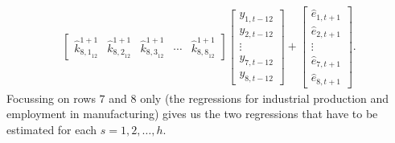 \documentclass[a4paper,11pt,listof=nochaptergap,oneside,pointednumbers,bibtotoc,bigheadings,liststotoc]{scrbook}
\theoremstyle{mysatz}
\theoremstyle{mydefinition}
\theoremstyle{mybemerkung}
\let\oldhat\hat
\newcommand{\hattnobf}[1]{\oldhat{#1}}
\begin{document}
\begin{enumerate}
\begin{equation}
\begin{split}
\begin{bmatrix}
		{\hattnobf{k}_{{8, 1}_{12}}^{1+1}} & {\hattnobf{k}_{{8, 2}_{12}}^{1+1}} & {\hattnobf{k}_{{8, 3}_{12}}^{1+1}} & \cdots & {\hattnobf{k}_{{8, 8}_{12}}^{1+1}}
 		\end{bmatrix} 
		\begin{bmatrix}
    		y_{1,t-12} \\
    		y_{2,t-12} \\
		\vdots \\
		y_{7, t-12} \\
		y_{8, t-12}
 		\end{bmatrix} + 
		\begin{bmatrix}
    		\hattnobf{e}_{1, t+1} \\
    		\hattnobf{e}_{2, t+1} \\
		\vdots \\
		\hattnobf{e}_{7, t+1} \\
		\hattnobf{e}_{8, t+1}
 		\end{bmatrix}. 
\end{split}								
\end{equation}
Focussing on rows $7$ and $8$ only (the regressions for industrial production and employment in manufacturing) gives us the two regressions that have to be estimated for each $s = 1, 2, \dots, h$.


\end{enumerate}
\end{document}
